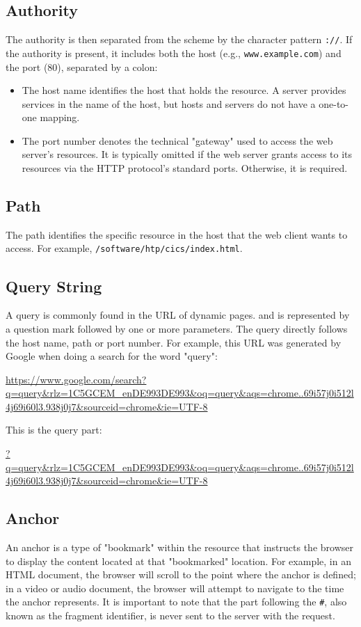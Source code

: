 \subsection*{Authority}
The authority is then separated from the scheme by the character pattern \texttt{://}. If the authority is present, it includes both the host (e.g., \texttt{www.example.com}) and the port (80), separated by a colon:

\begin{itemize}
  \item The host name identifies the host that holds the resource. A server provides services in the name of the host, but hosts and servers do not have a one-to-one mapping.
  \item The port number denotes the technical "gateway" used to access the web server's resources. It is typically omitted if the web server grants access to its resources via the HTTP protocol's standard ports. Otherwise, it is required.
\end{itemize}

\subsection*{Path}
The path identifies the specific resource in the host that the web client wants to access. For example, \texttt{/software/htp/cics/index.html}.

\subsection*{Query String}
A query is commonly found in the URL of dynamic pages. and is represented by a question mark followed by one or more parameters. The query directly follows the host name, path or port number. For example, this URL was generated by Google when doing a search for the word "query":

\begin{center}
  \url{https://www.google.com/search?q=query&rlz=1C5GCEM_enDE993DE993&oq=query&aqs=chrome..69i57j0i512l4j69i60l3.938j0j7&sourceid=chrome&ie=UTF-8}
\end{center}

\noindent This is the query part:

\begin{center}
  \url{?q=query&rlz=1C5GCEM_enDE993DE993&oq=query&aqs=chrome..69i57j0i512l4j69i60l3.938j0j7&sourceid=chrome&ie=UTF-8}
\end{center}

\subsection*{Anchor}
An anchor is a type of "bookmark" within the resource that instructs the browser to display the content located at that "bookmarked" location. For example, in an HTML document, the browser will scroll to the point where the anchor is defined; in a video or audio document, the browser will attempt to navigate to the time the anchor represents. It is important to note that the part following the \texttt{\#}, also known as the fragment identifier, is never sent to the server with the request.

